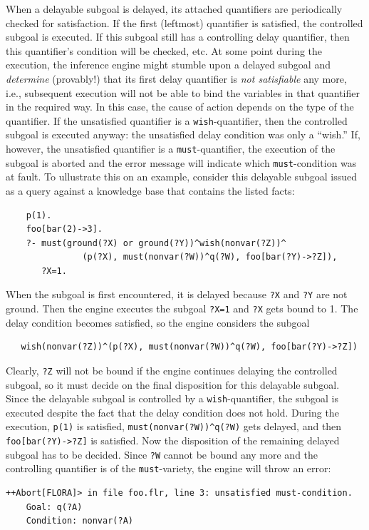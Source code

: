 \documentclass[11pt]{article}
\begin{document}
When a delayable subgoal is delayed, its attached quantifiers are
periodically checked for satisfaction. If the first (leftmost) quantifier is satisfied,
the controlled subgoal is executed. If this subgoal still has a controlling
delay quantifier, then this quantifier's condition will be checked, etc.
At some point during the execution, the inference engine might stumble upon
a delayed subgoal and \emph{determine} (provably!) 
that its first delay quantifier is \emph{not satisfiable} any more, i.e.,
subsequent execution will not be able to bind the variables in that quantifier
in the required way.
In this case, the cause of action depends on the type of the quantifier.
If the unsatisfied quantifier is a  \texttt{wish}-quantifier, then the  
controlled subgoal is executed anyway: the unsatisfied delay condition
was only a ``wish.'' If, however, the unsatisfied quantifier is a
\texttt{must}-quantifier, the execution of the subgoal is aborted and 
the error message will indicate which 
\texttt{must}-condition was at fault.
To ullustrate this on an example, consider this delayable subgoal issued as
a query against a knowledge base that contains the listed facts:
\begin{verbatim}
    p(1).
    foo[bar(2)->3].
    ?- must(ground(?X) or ground(?Y))^wish(nonvar(?Z))^
               (p(?X), must(nonvar(?W))^q(?W), foo[bar(?Y)->?Z]),
       ?X=1.
\end{verbatim}
When the subgoal is first encountered, it is delayed because \texttt{?X}
and \texttt{?Y} are not ground. Then the engine executes the subgoal
\texttt{?X=1} and \texttt{?X} gets bound to 1. The
delay condition becomes satisfied, so the engine considers the subgoal
\begin{verbatim}
   wish(nonvar(?Z))^(p(?X), must(nonvar(?W))^q(?W), foo[bar(?Y)->?Z])
\end{verbatim}
Clearly, \texttt{?Z} will not be bound if the engine continues delaying the
controlled subgoal, so it must decide on the final disposition for this
delayable subgoal. Since the delayable subgoal
is controlled by a \texttt{wish}-quantifier,
the subgoal is executed despite the fact that the delay condition does not
hold. During the execution, \texttt{p(1)} is
satisfied, \texttt{must(nonvar(?W))\^{}q(?W)} gets delayed, and then
\texttt{foo[bar(?Y)->?Z]} is satisfied. 
Now the disposition of the remaining delayed subgoal has to be decided.
Since \texttt{?W} cannot be bound any more and the controlling quantifier
is of the \texttt{must}-variety, the engine will throw an error:
\begin{verbatim}
++Abort[FLORA]> in file foo.flr, line 3: unsatisfied must-condition.
	Goal: q(?A)
	Condition: nonvar(?A)
\end{verbatim}
\end{document}
